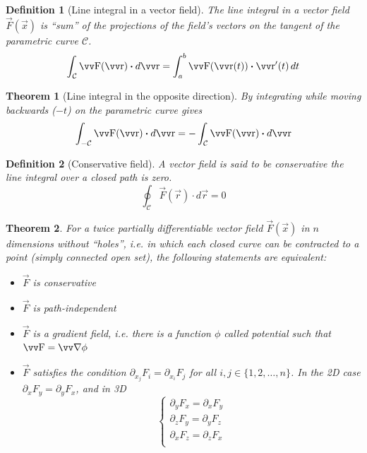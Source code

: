 \documentclass[twocolumn, margin=normal]{tex/hsrzf}
\theoremstyle{fuvarzf}
\newtheorem{theorem}{Theorem}
\newtheorem{definition}{Definition}
\begin{document}
\begin{definition}[Line integral in a vector field]
  The line integral in a vector field \(\vec{F}(\vec{x})\) is ``sum'' of the
  projections of the field's vectors on the tangent of the parametric curve
  \(\mathcal{C}\).
  \[
    \int_\mathcal{C} \vec{F}(\vec{r})\dotp d\vec{r}
    = \int_a^b \vec{F}(\vec{r}(t))\dotp \vec{r}'(t) \,dt
  \]
\end{definition}

\begin{theorem}[Line integral in the opposite direction]
  By integrating while moving backwards (\(-t\)) on the parametric curve gives
  \[
    \int_{-\mathcal{C}} \vec{F}(\vec{r})\dotp d\vec{r}
    = -\int_{\mathcal{C}} \vec{F}(\vec{r})\dotp d\vec{r}
  \]
\end{theorem}

\begin{definition}[Conservative field]
  A vector field is said to be \emph{conservative} the line integral over a
  closed path is zero.
  \[
    \oint_\mathcal{C} \vec{F}(\vec{r})\cdot d\vec{r} = 0
  \]
\end{definition}

\begin{theorem}
  For a twice partially differentiable vector field \(\vec{F}(\vec{x})\) in
  \(n\) dimensions without ``holes'', i.e. in which each closed curve can be
  contracted to a point (simply connected open set), the following statements
  are equivalent:
  \begin{itemize}
    \item \(\vec{F}\) is conservative
    \item \(\vec{F}\) is path-independent
    \item \(\vec{F}\) is a \emph{gradient field}, i.e. there is a
      function \(\phi\) called \emph{potential} such that \(\vec{F} = \grad
      \phi\)
    \item \(\vec{F}\) satisfies the condition \(\partial_{x_j} F_i =
      \partial_{x_i} F_j\) for all \(i,j \in \{1,2,\ldots,n\}\). In the 2D case
      \(\partial_x F_y = \partial_y F_x\), and in 3D
      \[
        \begin{cases}
          \partial_y F_x = \partial_x F_y \\
          \partial_z F_y = \partial_y F_z \\
          \partial_x F_z = \partial_z F_x \\
        \end{cases}
      \]
  \end{itemize}
\end{theorem}
\end{document}
